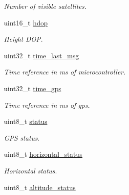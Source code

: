 \begin{DoxyCompactItemize}
\begin{DoxyCompactList}\small\item\em Number of visible satellites. \end{DoxyCompactList}\item 
\hypertarget{structgps__t_ac4b5c6c3d8d655767447eb2aa3db2518}{uint16\+\_\+t \hyperlink{structgps__t_ac4b5c6c3d8d655767447eb2aa3db2518}{hdop}}\label{structgps__t_ac4b5c6c3d8d655767447eb2aa3db2518}

\begin{DoxyCompactList}\small\item\em Height D\+O\+P. \end{DoxyCompactList}\item 
\hypertarget{structgps__t_a44b84720a00c9e15457d24f15621430c}{uint32\+\_\+t \hyperlink{structgps__t_a44b84720a00c9e15457d24f15621430c}{time\+\_\+last\+\_\+msg}}\label{structgps__t_a44b84720a00c9e15457d24f15621430c}

\begin{DoxyCompactList}\small\item\em Time reference in ms of microcontroller. \end{DoxyCompactList}\item 
\hypertarget{structgps__t_af12bf194d20a397f31976bf06602d45b}{uint32\+\_\+t \hyperlink{structgps__t_af12bf194d20a397f31976bf06602d45b}{time\+\_\+gps}}\label{structgps__t_af12bf194d20a397f31976bf06602d45b}

\begin{DoxyCompactList}\small\item\em Time reference in ms of gps. \end{DoxyCompactList}\item 
\hypertarget{structgps__t_aaa0854f799a40951088f9c39699292a7}{uint8\+\_\+t \hyperlink{structgps__t_aaa0854f799a40951088f9c39699292a7}{status}}\label{structgps__t_aaa0854f799a40951088f9c39699292a7}

\begin{DoxyCompactList}\small\item\em G\+P\+S status. \end{DoxyCompactList}\item 
\hypertarget{structgps__t_ac11a2c4b6291bc7e0db1510f514683ae}{uint8\+\_\+t \hyperlink{structgps__t_ac11a2c4b6291bc7e0db1510f514683ae}{horizontal\+\_\+status}}\label{structgps__t_ac11a2c4b6291bc7e0db1510f514683ae}

\begin{DoxyCompactList}\small\item\em Horizontal status. \end{DoxyCompactList}\item 
\hypertarget{structgps__t_a735c356c141ada40ddf7d35e7bed28b7}{uint8\+\_\+t \hyperlink{structgps__t_a735c356c141ada40ddf7d35e7bed28b7}{altitude\+\_\+status}}\label{structgps__t_a735c356c141ada40ddf7d35e7bed28b7}


\end{DoxyCompactItemize}
